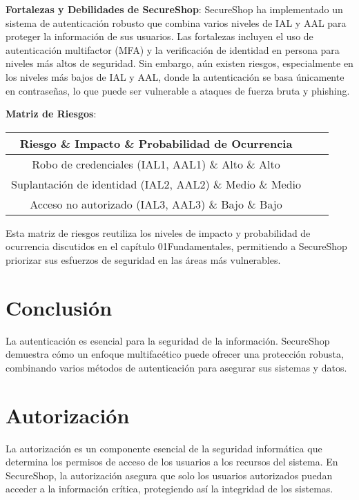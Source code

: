 \textbf{Fortalezas y Debilidades de SecureShop}:
SecureShop ha implementado un sistema de autenticación robusto que combina varios niveles de IAL y AAL para proteger la información de sus usuarios. Las fortalezas incluyen el uso de autenticación multifactor (MFA) y la verificación de identidad en persona para niveles más altos de seguridad. Sin embargo, aún existen riesgos, especialmente en los niveles más bajos de IAL y AAL, donde la autenticación se basa únicamente en contraseñas, lo que puede ser vulnerable a ataques de fuerza bruta y phishing.

\textbf{Matriz de Riesgos}:
\begin{tabular}{|c|c|c|}
\hline
\textbf{Riesgo} \& \textbf{Impacto} \& \textbf{Probabilidad de Ocurrencia} \\
\hline
Robo de credenciales (IAL1, AAL1) \& Alto \& Alto \\
\hline
Suplantación de identidad (IAL2, AAL2) \& Medio \& Medio \\
\hline
Acceso no autorizado (IAL3, AAL3) \& Bajo \& Bajo \\
\hline
\end{tabular}

Esta matriz de riesgos reutiliza los niveles de impacto y probabilidad de ocurrencia discutidos en el capítulo 01Fundamentales, permitiendo a SecureShop priorizar sus esfuerzos de seguridad en las áreas más vulnerables.

\section{Conclusión}
La autenticación es esencial para la seguridad de la información. SecureShop demuestra cómo un enfoque multifacético puede ofrecer una protección robusta, combinando varios métodos de autenticación para asegurar sus sistemas y datos.






\section{Autorización}

La autorización es un componente esencial de la seguridad informática que determina los permisos de acceso de los usuarios a los recursos del sistema. En SecureShop, la autorización asegura que solo los usuarios autorizados puedan acceder a la información crítica, protegiendo así la integridad de los sistemas.

